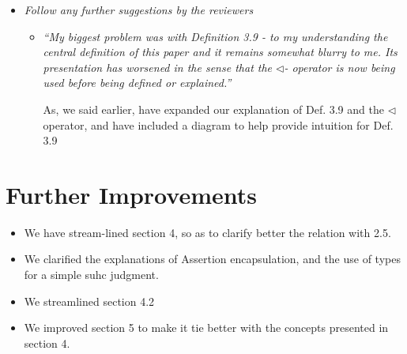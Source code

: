 \documentclass[11pt]{amsart}
\begin{document}
\begin{itemize}
\begin{itemize}
\item
\emph{Follow any further suggestions by the reviewers}
\begin{itemize}
\item
\emph{``My biggest problem was with Definition 3.9 - to my understanding the central definition of this paper and it remains somewhat blurry to me. Its presentation has worsened in the sense that the $\triangleleft$- operator is now being used before being defined or explained.''}
 
As, we said earlier, have expanded our explanation of Def. 3.9 and the $\triangleleft$ operator, and have included a diagram to help provide intuition for Def. 3.9
 
\end{itemize}
\end{itemize}
\end{itemize}

\section{Further Improvements}

\begin{itemize}
\item
We have stream-lined section 4, so as to clarify better the relation with 2.5.
\item
We clarified the explanations of Assertion encapsulation, and the use of types for a simple suhc judgment.

\item
We streamlined section 4.2

\item
We improved section 5 to make it tie better with the concepts presented in section 4.

\end{itemize}


 
\end{document}
